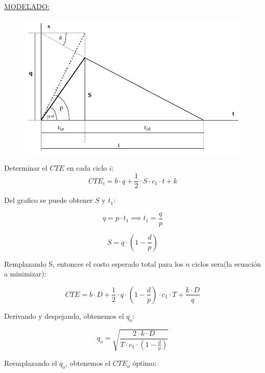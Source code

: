 \documentclass{article}
\begin{document}
\noindent
\underline{MODELADO:}

\begin{figure}[h!]
    \includegraphics[width=\linewidth]{imagenes/stock-modelo-no-instantaneo.png}
\end{figure}

Determinar el \(CTE\) en cada ciclo \(i\):
\begin{equation}
    CTE_i= b \cdot q + \frac{1}{2} \cdot S \cdot c_1 \cdot t + k
\end{equation}

Del grafico se puede obtener \(S\) y \(t_1\):

\begin{equation}
    q= p \cdot t_1 \implies t_1 = \frac{q}{p}
\end{equation}

\begin{equation}
    S = q \cdot (1 - \frac{d}{p})
\end{equation}

Remplazando S, entonces el costo esperado total para los \(n\) ciclos sera(la ecuación a minimizar):

\begin{equation}
    CTE = b \cdot D + \frac{1}{2} \cdot q \cdot (1-\frac{d}{p}) \cdot c_1 \cdot T + \frac{k \cdot D}{q} 
\end{equation}

Derivando y despejando, obtenemos el \(q_o\):

\begin{equation}
    q_o = \sqrt{\frac{2 \cdot k \cdot D}{T \cdot c_1 \cdot (1-\frac{d}{p})}}
\end{equation}

Reemplazando el \(q_o\), obtenemos el \(CTE_o\) óptimo:
\end{document}
